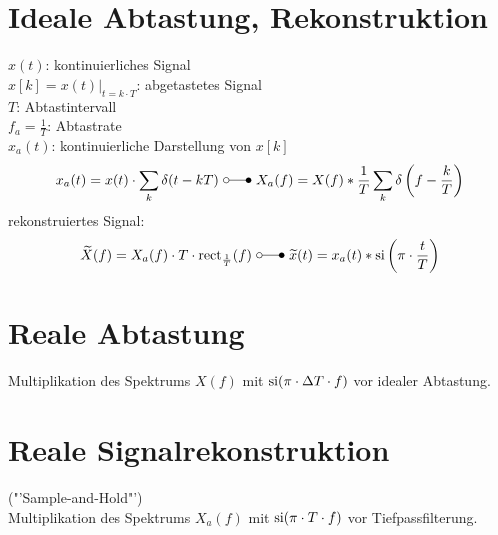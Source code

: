 \documentclass[a4paper, 10pt, fleqn]{article}
\begin{document}
\section{Ideale Abtastung, Rekonstruktion}
$x(t)$: kontinuierliches Signal\\
$x[k] = x(t) |_{t=k \cdot T}$: abgetastetes Signal\\
$T$: Abtastintervall\\
$f_a = \frac{1}{T}$: Abtastrate\\
$x_a(t)$: kontinuierliche Darstellung von $x[k]$\\
\[ x_a(t) = x(t) \cdot \sum\limits_{k} \delta (t - kT) ~ \laplace ~ 
X_a(f) = X(f) * \frac{1}{T} \sum\limits_{k} \delta \left(f - \frac{k}{T}\right) \]
rekonstruiertes Signal:
\[ \widetilde{X}(f) = X_a(f) \cdot T \cdot \rect_{\frac{1}{T}}(f) ~ \laplace ~ 
\widetilde{x}(t) = x_a(t) * \si\left(\pi \cdot \frac{t}{T}\right) \]

\section{Reale Abtastung}
Multiplikation  des Spektrums $X(f)$ mit $\operatorname{si}(\pi \cdot \Delta T \cdot f)$ vor 
idealer Abtastung. 

\section{Reale Signalrekonstruktion}
("'Sample-and-Hold"')\\
Multiplikation des Spektrums $X_a(f)$ mit $\operatorname{si}(\pi \cdot T \cdot f)$ vor 
Tiefpassfilterung. 
\end{document}
